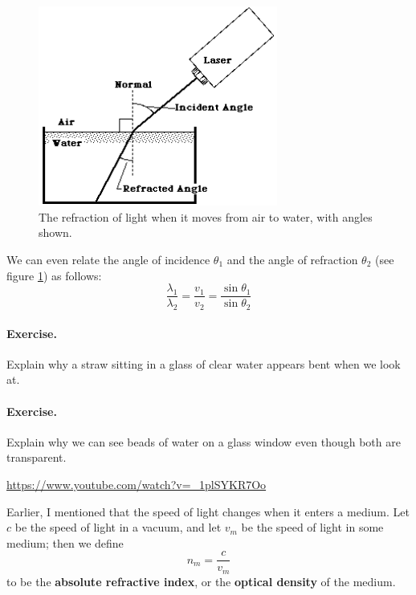 \documentclass[a4paper]{amsbook}
\newcommand\capcite[1]{}
\begin{document}
\begin{figure}
  \centering
  \includegraphics[width=0.7\textwidth]{refractionangle}
  \caption{The refraction of light when it moves from air to water, with angles shown. \capcite{http://www.cbakken.net/obookshelf/image027.gif}\label{fig:refractionangles}}
\end{figure}

We can even relate the angle of incidence $ \theta_1 $ and the angle of refraction $ \theta_2 $ (see figure \ref{fig:refractionangles}) as
follows:
\begin{displaymath}
  \frac{\lambda_1}{\lambda_2} = \frac{v_1}{v_2} = \frac{\sin \theta_1}{\sin \theta_2}
\end{displaymath}

\paragraph{Exercise.} Explain why a straw sitting in a glass of clear water appears bent when we look at.

\paragraph{Exercise.} Explain why we can see beads of water on a glass window even though both are transparent.

\begin{center}
\begin{tcolorbox}[width=0.8\textwidth,colback={red},title={\textbf{Go and watch...}},colbacktitle=yellow,coltitle=blue]
  \textcolor{white}{\url{https://www.youtube.com/watch?v=_1plSYKR7Oo}}
\end{tcolorbox}
\end{center}

Earlier, I mentioned that the speed of light changes when it enters a medium. Let $ c $ be the speed of
light in a vacuum, and let $ v_m $ be the speed of light in some medium; then we define
\begin{equation}
  n_m = \frac{c}{v_m}
\end{equation}
to be the \textbf{absolute refractive index}, or the \textbf{optical density} of the medium.
\end{document}
